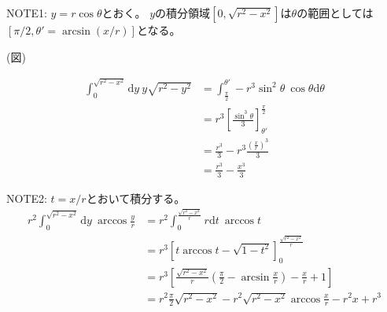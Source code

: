 NOTE1:
$y=r\cos \theta$とおく。
$y$の積分領域$[0, \sqrt{r^{2}-x^{2}}]$は$\theta$の範囲としては$[\pi/2, \theta' = \arcsin(x/r)]$となる。

(図)

\begin{align}
\int^{\sqrt{r^{2}-x^{2}}}_{0}\mathrm{d}y\ y\sqrt{r^{2}-y^{2}} &= \int^{\theta'}_{\frac{\pi}{2}}-r^{3}\sin^{2}\theta\ \cos\theta \mathrm{d}\theta\nonumber \\
&= r^{3}\left[ \frac{\sin^{3}\theta}{3} \right]^{\frac{\pi}{2}}_{\theta'}\nonumber \\
&= \frac{r^{3}}{3} - r^{3}\frac{\left( \frac{x}{r} \right)^{3}}{3}\nonumber \\
&= \frac{r^{3}}{3} - \frac{x^{3}}{3}
\end{align}

NOTE2:
$t = x/r$とおいて積分する。
\begin{align}
r^{2}\int^{\sqrt{r^{2}-x^{2}}}_{0}\mathrm{d}y\ \arccos \frac{y}{r} &= r^{2}\int^{\frac{\sqrt{r^{2}-x^{2}}}{r}}_{0}r\mathrm{d}t\ \arccos t\nonumber \\
&= r^{3}\left[ t\arccos t - \sqrt{1-t^{2}} \right]^{\frac{\sqrt{r^{2}-x^{2}}}{r}}_{0}\nonumber \\
&= r^{3}\left[ \frac{\sqrt{r^{2}-x^{2}}}{r}\left( \frac{\pi}{2} - \arcsin \frac{x}{r} \right) - \frac{x}{r} + 1 \right]\nonumber \\
&= r^{2}\frac{\pi}{2}\sqrt{r^{2}-x^{2}} - r^{2}\sqrt{r^{2}-x^{2}}\arccos\frac{x}{r} - r^{2}x + r^{3}
\end{align}
